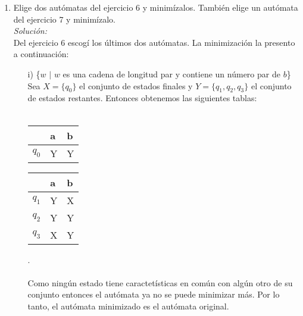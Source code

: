 \documentclass[letterpaper,11pt]{article}
\begin{document}
\begin{enumerate}
\item Elige dos autómatas del ejercicio 6 y minimízalos. También elige un
autómata del ejercicio 7 y minimízalo.
    \textit{\\Solución:\\}
    Del ejercicio 6 escogí los últimos dos autómatas. La minimización la
    presento a continuación:
    \begin{itemize}
     \item[i)] \{$w$ $|$ $w$ es una cadena de longitud par y contiene un número
    par de $b$\} \\
    Sea $X = \{q_0\}$ el conjunto de estados finales y $Y = \{q_1, q_2, q_3\}$
    el conjunto de estados restantes. Entonces obtenemos las siguientes 
    tablas:\\ \\
    \begin{center}
    \begin{tabular}{||l | l | l||}
    \hline
    \hline
     & a & b \\
     \hline
     $q_0$ & Y & Y\\
     \hline
     \end{tabular}
     \begin{tabular}{||l | l | l||}
     
    \hline
    \hline
     & a & b \\
     \hline
     $q_1$ & Y & X\\
     \hline
     $q_2$ & Y & Y \\
     \hline
     $q_3$ & X & Y\\
     \hline
     \end{tabular}
     \end{center}
     .\\ \\
     Como ningún estado tiene caractetísticas en común con algún otro de su
     conjunto entonces el autómata ya no se puede minimizar más. Por lo
     tanto, el autómata minimizado es el autómata original.
    

\end{itemize}
\end{enumerate}
\end{document}
